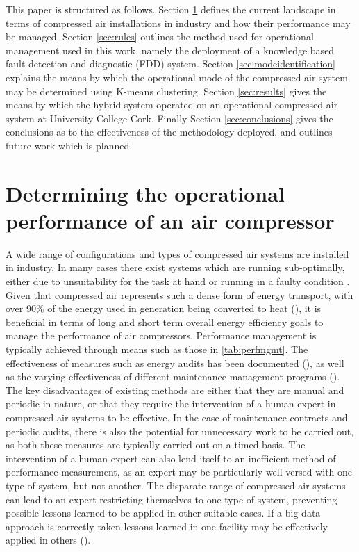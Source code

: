 This paper is structured as follows. Section \ref{sec:probstatement} defines the current landscape in terms of compressed air installations in industry and how their performance may be managed. Section \ref{sec:rules} outlines the method used for operational management used in this work, namely the deployment of a knowledge based fault detection and diagnostic (FDD) system. Section \ref{sec:modeidentification} explains the means by which the operational mode of the compressed air system may be determined using K-means clustering. Section \ref{sec:results} gives the means by which the hybrid system operated on an operational compressed air system at University College Cork. Finally Section \ref{sec:conclusions} gives the conclusions as to the effectiveness of the methodology deployed, and outlines future work which is planned.

\section{Determining the operational performance of an air compressor}
\label{sec:probstatement}
A wide range of configurations and types of compressed air systems are installed in industry. In many cases there exist systems which are running sub-optimally, either due to unsuitability for the task at hand or running in a faulty condition \cite{SEAI2007a}. Given that compressed air represents such a dense form of energy transport, with over 90\% of the energy used in generation being converted to heat (\cite{SEAI}), it is beneficial in terms of long and short term overall energy efficiency goals to manage the performance of air compressors. Performance management is typically achieved through means such as those in  \autoref{tab:perfmgmt}. The effectiveness of measures such as energy audits has been documented (\cite{Fleiter2012}), as well as the varying effectiveness of different maintenance management programs (\cite{Duffuaa2015}). The key disadvantages of existing methods are either that they are manual and periodic in nature, or that they require the intervention of a human expert in compressed air systems to be effective. In the case of maintenance contracts and periodic audits, there is also the potential for unnecessary work to be carried out, as both these measures are typically carried out on a timed basis. The intervention of a human expert can also lend itself to an inefficient method of performance measurement, as an expert may be particularly well versed with one type of system, but not another. The disparate range of compressed air systems can lead to an expert restricting themselves to one type of system, preventing possible lessons learned to be applied in other suitable cases. If a big data approach is correctly taken lessons learned in one facility may be effectively applied in others (\cite{ODonovan2015}). 

